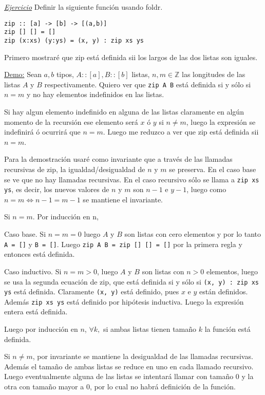 \documentclass[12pt]{extarticle}
\def\demostracion{\underline{Demo:} }
\def\ejercicio{\textit{\underline{Ejercicio} }}
\newcommand\hsline[1]{\texttt{#1}}
\begin{document}
\ejercicio Definir la siguiente función usando foldr.

\begin{verbatim}
zip :: [a] -> [b] -> [(a,b)]
zip [] [] = []
zip (x:xs) (y:ys) = (x, y) : zip xs ys
\end{verbatim}

Primero mostraré que zip está definida sii los largos de las dos listas son iguales.

\demostracion Sean $a, b$ tipos, $A :: [a], B :: [b]$ listas, $n, m \in \mathbb{Z}$ las longitudes de las listas $A$ y $B$ respectivamente. Quiero ver que \hsline{zip A B} está definida si y sólo si $n = m$ y no hay elementos indefinidos en las listas.

Si hay algun elemento indefinido en alguna de las listas claramente en algún momento de la recursión ese elemento será $x$ ó $y$ si $n \neq m$, luego la expresión se indefinirá ó ocurrirá que $n = m$. Luego me reduzco a ver que zip está definida sii $n = m$.

Para la demostración usaré como invariante que a través de las llamadas recursivas de zip, la igualdad/desigualdad de $n$ y $m$ se preserva. En el caso base se ve que no hay llamadas recursivas. En el caso recursivo sólo se llama a \hsline{zip xs ys}, es decir, los nuevos valores de $n$ y $m$ son $n-1$ e $y-1$, luego como $n = m \Leftrightarrow n-1 = m-1$ se mantiene el invariante.

Si $n = m$. Por inducción en n,

Caso base. Si $n = m = 0$ luego $A$ y $B$ son listas con cero elementos y por lo tanto \hsline{A = []} y \hsline{B = []}. Luego \hsline{zip A B = zip [] [] = []} por la primera regla y entonces está definida.

Caso inductivo. Si $n = m > 0$, luego $A$ y $B$ son listas con $n > 0$ elementos, luego se usa la segunda ecuación de zip, que está definida si y sólo si \hsline{(x, y) : zip xs ys} está definida. Claramente \hsline{(x, y)} está definido, pues $x$ e $y$ están definidos. Además \hsline{zip xs ys} está definido por hipótesis inductiva. Luego la expresión entera está definida.

Luego por inducción en $n$, $\forall k,$ si ambas listas tienen tamaño $k$ la función está definida.

Si $n \neq m$, por invariante se mantiene la desigualdad de las llamadas recursivas. Además el tamaño de ambas listas se reduce en uno en cada llamado recursivo. Luego eventualmente alguna de las listas se intentará llamar con tamaño 0 y la otra con tamaño mayor a 0, por lo cual no habrá definición de la función.
\end{document}
